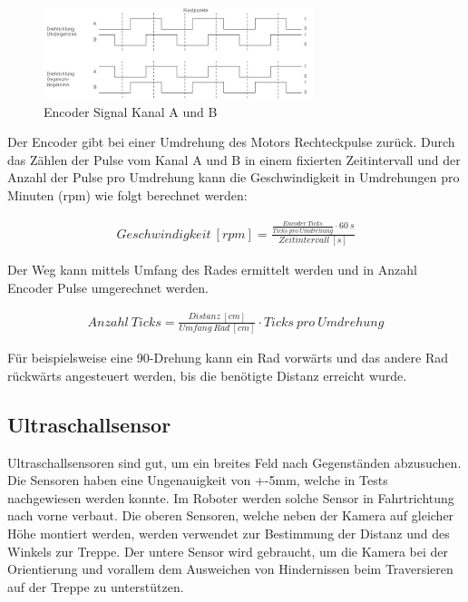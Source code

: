 \begin{figure}[h]
  \includegraphics[width=0.7\textwidth]{img/Elektronik/quadrature.png}
  \centering
  \caption{Encoder Signal Kanal A und B}
  \label{fig:encoder-sig}
\end{figure}

Der Encoder gibt bei einer Umdrehung des Motors Rechteckpulse zurück. Durch das Zählen der Pulse vom Kanal A und B in einem fixierten Zeitintervall und der Anzahl der Pulse pro Umdrehung kann die Geschwindigkeit in Umdrehungen pro Minuten (rpm) wie folgt berechnet werden:

\begin{align*}
    Geschwindigkeit\ [rpm] = \frac{\frac{Encoder\ Ticks}{Ticks\ pro\ Umdrehung} \cdot 60\ s}{Zeitintervall\ [s]}
\end{align*}

Der Weg kann mittels Umfang des Rades ermittelt werden und in Anzahl Encoder Pulse umgerechnet werden.

\begin{align*}
    Anzahl\ Ticks = \frac{Distanz\ [cm]}{Umfang\ Rad\ [cm]} \cdot Ticks\ pro\ Umdrehung
\end{align*}

Für beispielsweise eine 90\textdegree-Drehung kann ein Rad vorwärts und das andere Rad rückwärts angesteuert werden, bis die benötigte Distanz erreicht wurde. 


\subsection{Ultraschallsensor}

Ultraschallsensoren sind gut, um ein breites Feld nach Gegenständen abzusuchen. Die Sensoren haben eine Ungenauigkeit von +-5mm, welche in Tests nachgewiesen werden konnte.
Im Roboter werden solche Sensor in Fahrtrichtung nach vorne verbaut. Die oberen Sensoren, welche neben der Kamera auf gleicher Höhe montiert werden, werden verwendet zur Bestimmung der Distanz und des Winkels zur Treppe. Der untere Sensor wird gebraucht, um die Kamera bei der Orientierung und vorallem dem Ausweichen von Hindernissen beim Traversieren auf der Treppe zu unterstützen.

